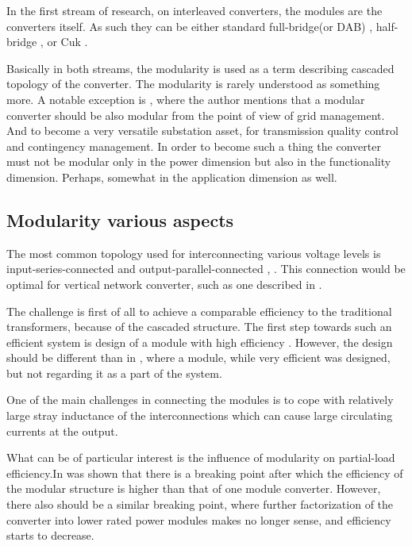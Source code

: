 \documentclass[]{scrartcl}
\begin{document}
In the first stream of research, on interleaved converters, the modules are the converters itself. As such they can be either standard full-bridge(or DAB) \cite{Bottion2015}, half-bridge \cite{Yao2012}, or Cuk \cite{Kamnarn2009}. 

Basically in both streams, the modularity is used as a term describing cascaded topology of the converter. The modularity is rarely understood as something more. A notable exception is \cite{Yousefpoor2014}, where the author mentions that a modular converter should be also modular from the point of view of grid management. And to become a very versatile  substation asset, for transmission quality control and contingency management. In order to become such a thing the converter must not be modular only in the power dimension but also in the functionality dimension. Perhaps, somewhat in the application dimension as well. 


\subsection{Modularity various aspects}

The most common topology used for interconnecting various voltage levels is input-series-connected and output-parallel-connected \cite{Fan2011}, \cite{wang2014}. This connection would be optimal for vertical network converter, such as one described in \cite{Dong2013}. 

The challenge is first of all to achieve a comparable efficiency to the traditional transformers, because of the cascaded structure. The first step towards such an efficient system is design of a module with high efficiency \cite{Fan2011}.  However, the design should be different than in \cite{Fan2011}, where a module, while very efficient was designed, but not regarding it as a part of the system.

One of the main challenges in connecting the modules is to cope with relatively large stray inductance of the interconnections which can cause large circulating currents at the output.


What can be of particular interest is the influence of modularity on partial-load efficiency.In \cite{Yang2014} was shown that there is a breaking point after which the efficiency of the modular structure is higher than that of one module converter. However, there also should be a similar breaking point, where further factorization of the converter into lower rated power modules makes no longer sense, and efficiency starts to decrease. 
\end{document}
